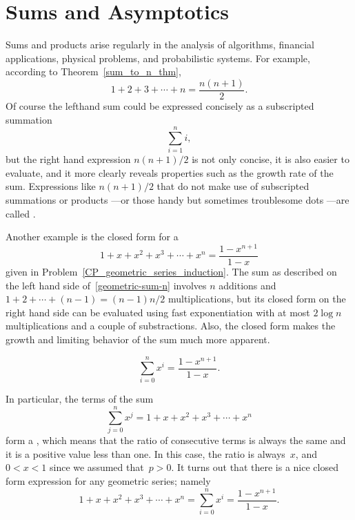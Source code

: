 \chapter{Sums and Asymptotics}\label{chap:asymptotics}

Sums and products arise regularly in the analysis of algorithms,
financial applications, physical problems, and probabilistic systems.
For example, according to Theorem~\ref{sum_to_n_thm},
\begin{equation}\label{sum1n_closedform}
1 + 2 + 3 +\cdots + n = \frac{n(n+1)}{2}.
\end{equation}
Of course the lefthand sum could be expressed concisely as a subscripted summation
\[
\sum_{i=1}^n i,
\]
but the right hand expression $n(n+1)/2$ is not only concise, it is
also easier to evaluate, and it more clearly reveals properties such
as the growth rate of the sum.  Expressions like $n(n+1)/2$ that do
not make use of subscripted summations or products ---or those handy
but sometimes troublesome dots ---are called .

Another example is the closed form for a 
\begin{equation}\label{geometric-sum-n}
1 + x + x^2 + x^3 + \cdots + x^{n} = \frac{1 - x^{n+1}}{1 - x}
\end{equation}
given in Problem~\ref{CP_geometric_series_induction}.  The sum as
described on the left hand side of~\eqref{geometric-sum-n} involves
$n$ additions and $1 + 2 + \cdots + (n-1) = (n-1)n/2$ multiplications,
but its closed form on the right hand side can be evaluated using fast
exponentiation with at most $2 \log n$ multiplications and a couple of
substractions.  Also, the closed form makes the growth and limiting
behavior of the sum much more apparent.

\iffalse

\begin{equation}\label{geometric-sum-n-1}
    \sum_{i = 0}^{n} x^i = \frac{1 - x^{n+1}}{1 - x}.
\end{equation}

In particular, the terms of the sum
\[
    \sum_{j = 0}^{n} x^j = 1 + x + x^2 + x^3 + \cdots + x^{n}
\]
form a , which means that the ratio of
consecutive terms is always the same and it is a positive value less
than one.  In this case, the ratio is always~$x$, and $0 < x < 1$
since we assumed that~$p > 0$.  It turns out that there is a nice
closed form expression for any geometric series; namely
\begin{equation}\label{geometric-sum-n-1}
1 + x + x^2 + x^3 + \cdots + x^{n} = \sum_{i = 0}^{n} x^i = \frac{1 - x^{n+1}}{1 - x}.
\end{equation}

